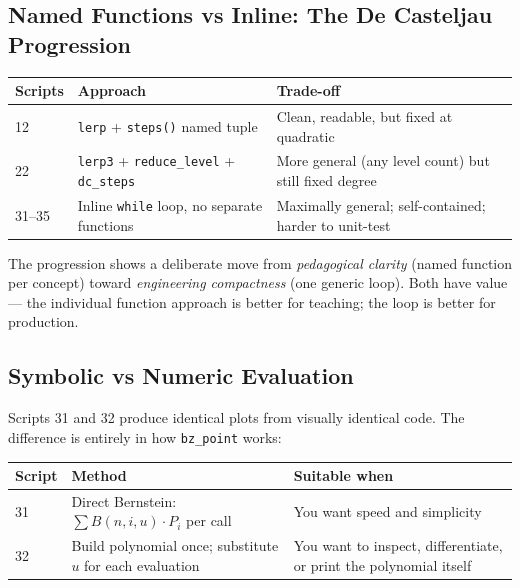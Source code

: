 \documentclass[12pt, a4paper]{article}
\newcommand{\cd}[1]{\texttt{#1}}
\begin{document}
\subsection{Named Functions vs Inline: The De Casteljau Progression}

\begin{center}
\renewcommand{\arraystretch}{1.3}
\begin{tabular}{lp{4cm}p{5.5cm}}
\toprule
Scripts & Approach & Trade-off \\
\midrule
12 &
  \cd{lerp} + \cd{steps()} named tuple &
  Clean, readable, but fixed at quadratic \\
22 &
  \cd{lerp3} + \cd{reduce\_level} + \cd{dc\_steps} &
  More general (any level count) but still fixed degree \\
31--35 &
  Inline \cd{while} loop, no separate functions &
  Maximally general; self-contained; harder to unit-test \\
\bottomrule
\end{tabular}
\end{center}

The progression shows a deliberate move from
\emph{pedagogical clarity} (named function per concept)
toward \emph{engineering compactness} (one generic loop).
Both have value --- the individual function approach
is better for teaching; the loop is better for production.

\subsection{Symbolic vs Numeric Evaluation}

Scripts 31 and 32 produce identical plots from visually
identical code.
The difference is entirely in how \cd{bz\_point} works:

\begin{center}
\begin{tabular}{lp{4.5cm}p{4.5cm}}
\toprule
Script & Method & Suitable when \\
\midrule
31 &
  Direct Bernstein: $\sum B(n,i,u) \cdot P_i$ per call &
  You want speed and simplicity \\[4pt]
32 &
  Build polynomial once; substitute $u$ for each evaluation &
  You want to inspect, differentiate, or print
  the polynomial itself \\
\bottomrule
\end{tabular}
\end{center}
\end{document}
